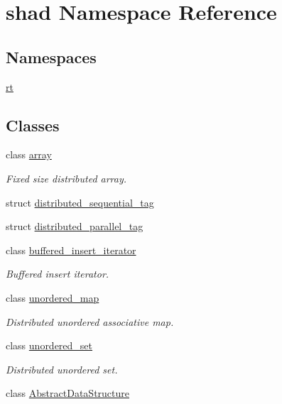 \hypertarget{namespaceshad}{\section{shad Namespace Reference}
\label{namespaceshad}
}
\subsection*{Namespaces}
\begin{DoxyCompactItemize}
\item 
\hyperlink{namespaceshad_1_1rt}{rt}
\end{DoxyCompactItemize}
\subsection*{Classes}
\begin{DoxyCompactItemize}
\item 
class \hyperlink{classshad_1_1array}{array}
\begin{DoxyCompactList}\small\item\em Fixed size distributed array. \end{DoxyCompactList}\item 
struct \hyperlink{structshad_1_1distributed__sequential__tag}{distributed\-\_\-sequential\-\_\-tag}
\item 
struct \hyperlink{structshad_1_1distributed__parallel__tag}{distributed\-\_\-parallel\-\_\-tag}
\item 
class \hyperlink{classshad_1_1buffered__insert__iterator}{buffered\-\_\-insert\-\_\-iterator}
\begin{DoxyCompactList}\small\item\em Buffered insert iterator. \end{DoxyCompactList}\item 
class \hyperlink{classshad_1_1unordered__map}{unordered\-\_\-map}
\begin{DoxyCompactList}\small\item\em Distributed unordered associative map. \end{DoxyCompactList}\item 
class \hyperlink{classshad_1_1unordered__set}{unordered\-\_\-set}
\begin{DoxyCompactList}\small\item\em Distributed unordered set. \end{DoxyCompactList}\item 
class \hyperlink{classshad_1_1AbstractDataStructure}{Abstract\-Data\-Structure}

\end{DoxyCompactItemize}

